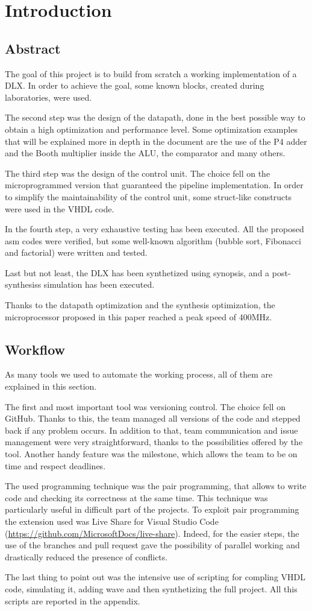 \chapter{Introduction}

\section{Abstract}
The goal of this project is to build from scratch a working implementation of a DLX. In order to achieve the goal, some known blocks, created during laboratories, were used. 

The second step was the design of the datapath, done in the best possible way to obtain a high optimization and performance level. Some optimization examples that will be explained more in depth in the document are the use of the P4 adder and the Booth multiplier inside the ALU, the comparator and many others. 

The third step was the design of the control unit. The choice fell on the microprogrammed version that guaranteed the pipeline implementation. In order to simplify the maintainability of the control unit, some struct-like constructs were used in the VHDL code. 

In the fourth step, a very exhaustive testing has been executed. All the proposed asm codes were verified, but some well-known algorithm (bubble sort, Fibonacci and factorial) were written and tested.

Last but not least, the DLX has been synthetized using synopsis, and a post-synthesiss simulation has been executed. 

Thanks to the datapath optimization and the synthesis optimization, the microprocessor proposed in this paper reached a peak speed of 400MHz.  
\section{Workflow}
As many tools we used to automate the working process, all of them are explained in this section.

The first and most important tool was versioning control. The choice fell on GitHub. Thanks to this, the team managed all versions of the code and stepped back if any problem occurs. In addition to that, team communication and issue management were very straightforward, thanks to the possibilities offered by the tool. Another handy feature was the milestone, which allows the team to be on time and respect deadlines. 

The used programming technique was the pair programming, that allows to write code and checking its correctness at the same time. This technique was particularly useful in difficult part of the projects. To exploit pair programming the extension used was Live Share for Visual Studio Code (\url{https://github.com/MicrosoftDocs/live-share}). Indeed, for the easier steps, the use of the branches and pull request gave the possibility of parallel working and drastically reduced the presence of conflicts. 

The last thing to point out was the intensive use of scripting for compling VHDL code, simulating it, adding wave and then synthetizing the full project. All this scripts are reported in the appendix.